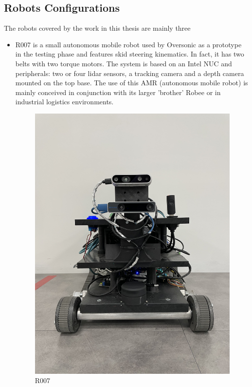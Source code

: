 \subsection{Robots Configurations}
The robots covered by the work in this thesis are mainly three 
\begin{itemize}
    \item R007 is a small autonomous mobile robot used by Oversonic as a prototype in the testing phase and features skid steering kinematics. In fact, it has two belts with two torque motors. The system is based on an Intel NUC and peripherals: two or four lidar sensors, a tracking camera and a depth camera mounted on the top base. The use of this AMR (autonomous mobile robot) is mainly conceived in conjunction with its larger 'brother' Robee or in industrial logistics environments.
    \begin{figure}[H]
        \centering
        \includegraphics[scale=0.05]{Images/Chapter 3/r007.jpg}
        \caption{R007}

\end{figure}
\end{itemize}

